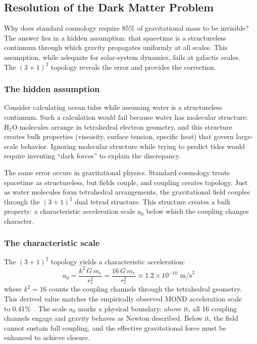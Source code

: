 \documentclass[aps,prd,preprint,superscriptaddress,showpacs,preprintnumbers,amsmath,amssymb,nofootinbib]{revtex4-2}
\begin{document}
\subsection{Resolution of the Dark Matter Problem}
\label{subsec:darkmatter}

Why does standard cosmology require 85\% of gravitational mass to be invisible? The answer lies in a hidden assumption: that spacetime is a structureless continuum through which gravity propagates uniformly at all scales. This assumption, while adequate for solar-system dynamics, fails at galactic scales. The $(3+1)^2$ topology reveals the error and provides the correction.

\subsubsection*{The hidden assumption}

Consider calculating ocean tides while assuming water is a structureless continuum. Such a calculation would fail because water has molecular structure: $\text{H}_2\text{O}$ molecules arrange in tetrahedral electron geometry, and this structure creates bulk properties (viscosity, surface tension, specific heat) that govern large-scale behavior. Ignoring molecular structure while trying to predict tides would require inventing ``dark forces'' to explain the discrepancy.

The same error occurs in gravitational physics. Standard cosmology treats spacetime as structureless, but fields couple, and coupling creates topology. Just as water molecules form tetrahedral arrangements, the gravitational field couples through the $(3+1)^2$ dual tetrad structure. This structure creates a bulk property: a characteristic acceleration scale $a_0$ below which the coupling changes character.

\subsubsection*{The characteristic scale}

The $(3+1)^2$ topology yields a characteristic acceleration:
\begin{equation}
a_0 = \frac{k^2 \, G \, m_e}{r_e^2} = \frac{16 \, G \, m_e}{r_e^2} \approx 1.2 \times 10^{-10} \text{ m/s}^2
\label{eq:a0-dm}
\end{equation}
where $k^2 = 16$ counts the coupling channels through the tetrahedral geometry. This derived value matches the empirically observed MOND acceleration scale~\cite{milgrom1983} to 0.41\%~\cite{paper5}. The scale $a_0$ marks a physical boundary: above it, all 16 coupling channels engage and gravity behaves as Newton described. Below it, the field cannot sustain full coupling, and the effective gravitational force must be enhanced to achieve closure.
\end{document}
